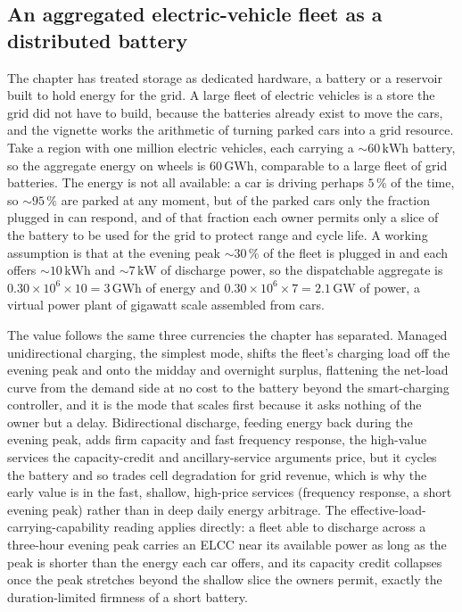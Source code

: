 \subsection{An aggregated electric-vehicle fleet as a distributed battery}

The chapter has treated storage as dedicated hardware, a battery or a
reservoir built to hold energy for the grid. A large fleet of electric
vehicles is a store the grid did not have to build, because the batteries
already exist to move the cars, and the vignette works the arithmetic of
turning parked cars into a grid resource. Take a region with one million
electric vehicles, each carrying a $\sim 60\,\si{\kilo\watt\hour}$ battery, so
the aggregate energy on wheels is $60\,\si{\giga\watt\hour}$, comparable to a
large fleet of grid batteries. The energy is not all available: a car is
driving perhaps $5\,\%$ of the time, so $\sim 95\,\%$ are parked at any
moment, but of the parked cars only the fraction plugged in can respond, and
of that fraction each owner permits only a slice of the battery to be used for
the grid to protect range and cycle life. A working assumption is that at the
evening peak $\sim 30\,\%$ of the fleet is plugged in and each offers
$\sim 10\,\si{\kilo\watt\hour}$ and $\sim 7\,\si{\kilo\watt}$ of discharge
power, so the dispatchable aggregate is $0.30\times 10^6\times 10 = 3\,\si{
\giga\watt\hour}$ of energy and $0.30\times 10^6\times 7 = 2.1\,\si{\giga
\watt}$ of power, a virtual power plant of gigawatt scale assembled from cars.

The value follows the same three currencies the chapter has separated.
Managed unidirectional charging, the simplest mode, shifts the fleet's charging
load off the evening peak and onto the midday and overnight surplus, flattening
the net-load curve from the demand side at no cost to the battery beyond the
smart-charging controller, and it is the mode that scales first because it asks
nothing of the owner but a delay. Bidirectional 
discharge, feeding energy back during the evening peak, adds firm capacity and
fast frequency response, the high-value services the capacity-credit and
ancillary-service arguments price, but it cycles the battery and so trades cell
degradation for grid revenue, which is why the early value is in the fast,
shallow, high-price services (frequency response, a short evening peak) rather
than in deep daily energy arbitrage. The effective-load-carrying-capability
reading applies directly: a fleet able to discharge across a three-hour evening
peak carries an ELCC near its available power as long as the peak is shorter
than the energy each car offers, and its capacity credit collapses once the
peak stretches beyond the shallow slice the owners permit, exactly the
duration-limited firmness of a short battery.

